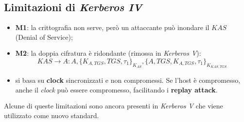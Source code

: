 \documentclass[11pt, a4paper, twoside, italian]{report}
\theoremstyle{plain}
\begin{document}
\subsection*{Limitazioni di \textit{Kerberos IV}}
\begin{itemize}
	\item \textbf{M1}: la crittografia non serve, però un attaccante può inondare il $KAS$ (Denial of Service);
	\item \textbf{M2}: la doppia cifratura è ridondante (rimossa in \textit{Kerberos V}): \[ KAS \rightarrow A: A,\{K_{A,TGS}, TGS, \tau_{1} \}_{K_{AS}},\{A, TGS, K_{A,TGS}, \tau_{1} \}_{K_{KAS, TGS}} \]
	\item si basa su \textbf{clock} sincronizzati e non compromessi. Se l'host è compromesso, anche il \textit{clock} può essere compromesso, facilitando i \textbf{replay attack}.
\end{itemize}
\noindent
Alcune di queste limitazioni sono ancora presenti in \textit{Kerberos V} che viene utilizzato come nuovo standard.


\newpage
\end{document}
